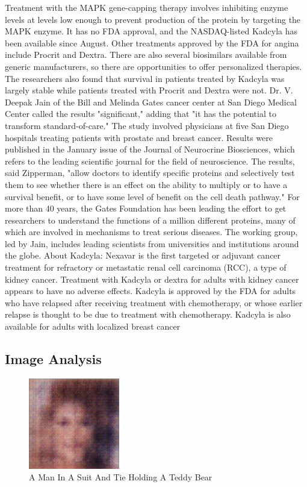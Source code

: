 \documentclass{article}%
\begin{document}
Treatment with the MAPK gene{-}capping therapy involves inhibiting enzyme levels at levels low enough to prevent production of the protein by targeting the MAPK enzyme. It has no FDA approval, and the NASDAQ{-}listed Kadcyla has been available since August.\newline%
Other treatments approved by the FDA for angina include Procrit and Dextra. There are also several biosimilars available from generic manufacturers, so there are opportunities to offer personalized therapies.\newline%
The researchers also found that survival in patients treated by Kadcyla was largely stable while patients treated with Procrit and Dextra were not.\newline%
Dr. V. Deepak Jain of the Bill and Melinda Gates cancer center at San Diego Medical Center called the results "significant," adding that "it has the potential to transform standard{-}of{-}care."\newline%
The study involved physicians at five San Diego hospitals treating patients with prostate and breast cancer. Results were published in the January issue of the Journal of Neurocrine Biosciences, which refers to the leading scientific journal for the field of neuroscience.\newline%
The results, said Zipperman, "allow doctors to identify specific proteins and selectively test them to see whether there is an effect on the ability to multiply or to have a survival benefit, or to have some level of benefit on the cell death pathway."\newline%
For more than 40 years, the Gates Foundation has been leading the effort to get researchers to understand the functions of a million different proteins, many of which are involved in mechanisms to treat serious diseases.\newline%
The working group, led by Jain, includes leading scientists from universities and institutions around the globe.\newline%
About Kadcyla:\newline%
Nexavar is the first targeted or adjuvant cancer treatment for refractory or metastatic renal cell carcinoma (RCC), a type of kidney cancer. Treatment with Kadcyla or dextra for adults with kidney cancer appears to have no adverse effects. Kadcyla is approved by the FDA for adults who have relapsed after receiving treatment with chemotherapy, or whose earlier relapse is thought to be due to treatment with chemotherapy. Kadcyla is also available for adults with localized breast cancer

%
\subsection{Image Analysis}%
\label{subsec:ImageAnalysis}%


\begin{figure}[h!]%
\centering%
\includegraphics[width=150px]{500_fake_images/samples_5_192.png}%
\caption{A Man In A Suit And Tie Holding A Teddy Bear}%
\end{figure}

%
\end{document}
